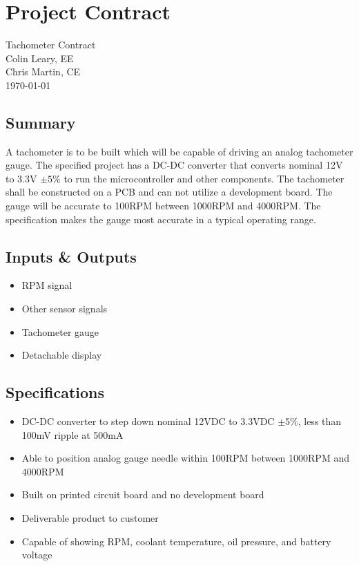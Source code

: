 \documentclass[11pt]{article}
\begin{document}
\newpage


\newpage

\appendix
\renewcommand\pagenumbering[1]{}
\section{Project Contract}
\label{app:contract}
\begin{singlespacing}
\begin{center}
\LARGE{Tachometer Contract}\\
\vspace{1.3em}
\large{Colin Leary, EE}\hfill\\
\large{Chris Martin, CE}\\
\vspace{1.3em}
\large{\today}

\end{center}


\subsection*{Summary}
A tachometer is to be built which will be capable of driving an analog tachometer gauge. The specified project has a DC-DC converter that converts nominal 12V to 3.3V $\pm5\%$ to run the microcontroller and other components. The tachometer shall be constructed on a PCB and can not utilize a development board. The gauge will be accurate to 100RPM between 1000RPM and 4000RPM. The specification makes the gauge most accurate in a typical operating range.

\subsection*{Inputs \& Outputs}
\begin{itemize}
    \item RPM signal
    \item Other sensor signals
    \item Tachometer gauge
    \item Detachable display
\end{itemize}


\subsection*{Specifications}
\begin{itemize}
    \item DC-DC converter to step down nominal 12VDC to 3.3VDC $\pm$5\%, less than 100mV ripple at 500mA
    \item Able to position analog gauge needle within  100RPM between 1000RPM and 4000RPM
    \item Built on printed circuit board and no development board
    \item Deliverable product to customer
    \item Capable of showing RPM, coolant temperature, oil pressure, and battery voltage
\end{itemize}
    \pagenumbering{gobble} %


\end{singlespacing}
\end{document}
